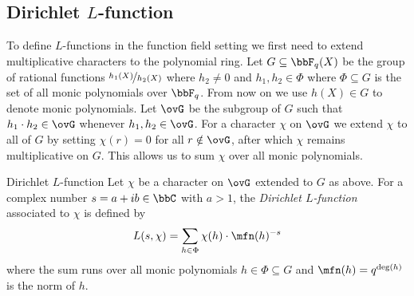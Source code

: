 \subsection{Dirichlet $L$-function}
To define $L$-functions in the function field setting we first need to extend multiplicative characters to the polynomial ring. Let $G\subseteq\bbF_q(X)$ be the group of rational functions $\nicefrac{h_1(X)}{h_2(X)}$ where $h_2\neq 0$ and $h_1,h_2\in\Phi$ where $\Phi\subseteq G$ is the set of all monic polynomials over $\bbF_q$. From now on we use $h(X)\in G$ to denote monic polynomials. Let $\ovG$ be the subgroup of $G$ such that $h_1\cdot h_2\in \ovG$ whenever $h_1,h_2\in\ovG$. For a character $\chi$ on $\ovG$ we extend $\chi$ to all of $G$ by setting $\chi(r)=0$ for all $r\notin \ovG$, after which $\chi$ remains multiplicative on $G$. This allows us to sum $\chi$ over all monic polynomials.
\begin{Definition}{Dirichlet $L$-function}{}
  Let $\chi$ be a character on $\ovG$ extended to $G$ as above. For a complex number $s=a+ib\in\bbC$ with $a>1$, the \emph{Dirichlet $L$-function} associated to $\chi$ is defined by $$L(s,\chi)=\sum_{h\in\Phi}\chi(h)\cdot \mfn(h)^{-s}$$where the sum runs over all monic polynomials $h\in\Phi\subseteq G$ and $\mfn(h)=q^{\deg(h)}$ is the norm of $h$.
\end{Definition}

